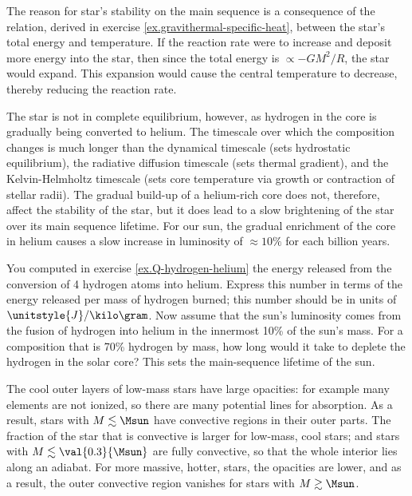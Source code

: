 The reason for star's stability on the main sequence is a consequence of the relation, derived in exercise \ref{ex.gravithermal-specific-heat}, between the star's total energy and temperature. If the reaction rate were to increase and deposit more energy into the star, then since the total energy is $\propto -GM^{2}/R$, the star would expand. This expansion would cause the central temperature to decrease, thereby reducing the reaction rate.

The star is not in complete equilibrium, however, as hydrogen in the core is gradually being converted to helium. The timescale over which the composition changes is much longer than the dynamical timescale (sets hydrostatic equilibrium), the radiative diffusion timescale (sets thermal gradient), and the Kelvin-Helmholtz timescale (sets core temperature via growth or contraction of stellar radii). The gradual build-up of a helium-rich core does not, therefore, affect the stability of the star, but it does lead to a slow brightening of the star over its main sequence lifetime. For our sun, the gradual enrichment of the core in helium causes a slow increase in luminosity of $\approx10\%$ for each billion years. 

\begin{exercisebox}
\label{ex.nuclear-burning-timescale}
You computed in exercise \ref{ex.Q-hydrogen-helium} the energy released from the conversion of 4 hydrogen atoms into helium. Express this number in terms of the energy released per mass of hydrogen burned; this number should be in units of $\unitstyle{J}/\kilo\gram$. Now assume that the sun's luminosity comes from the fusion of hydrogen into helium in the innermost 10\% of the sun's mass. For a composition that is 70\% hydrogen by mass, how long would it take to deplete the hydrogen in the solar core? This sets the main-sequence lifetime of the sun.
\end{exercisebox}

The cool outer layers of low-mass stars have large opacities: for example many elements are not ionized, so there are many potential lines for absorption. As a result, stars with $M\lesssim\Msun$ have convective regions in their outer parts. The fraction of the star that is convective is larger for low-mass, cool stars; and stars with $M \lesssim\val{0.3}{\Msun}$ are fully convective, so that the whole interior lies along an adiabat. For more massive, hotter, stars, the opacities are lower, and as a result, the outer convective region vanishes for stars with $M\gtrsim\Msun$.

